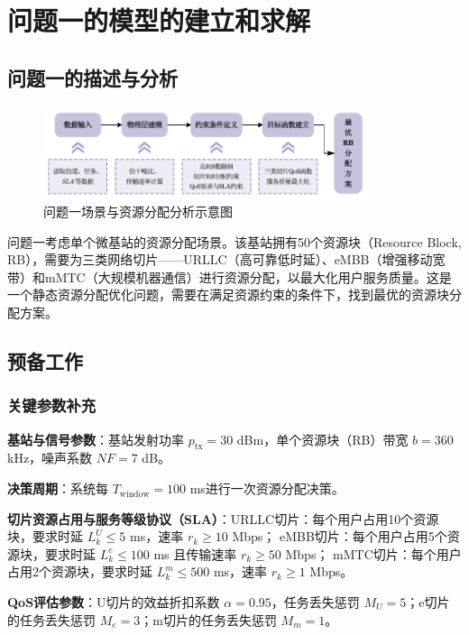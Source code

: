 \section{问题一的模型的建立和求解}
\subsection{问题一的描述与分析}
\begin{figure}[H]
    \centering
    \includegraphics[width=0.85\textwidth]{figures/第一问分析.pdf}
    \caption{问题一场景与资源分配分析示意图}
    \label{fig:q1-analysis}
\end{figure}

问题一考虑单个微基站的资源分配场景。该基站拥有50个资源块（Resource Block, RB），需要为三类网络切片——URLLC（高可靠低时延）、eMBB（增强移动宽带）和mMTC（大规模机器通信）进行资源分配，以最大化用户服务质量。这是一个静态资源分配优化问题，需要在满足资源约束的条件下，找到最优的资源块分配方案。

\subsection{预备工作}
\subsubsection{关键参数补充}

\textbf{基站与信号参数}：基站发射功率 $p_{\text{tx}} = 30$ dBm，单个资源块（RB）带宽 $b = 360$ kHz，噪声系数 $NF = 7$ dB。

\textbf{决策周期}：系统每 $T_{\text{window}} = 100$ ms进行一次资源分配决策。

\textbf{切片资源占用与服务等级协议（SLA）}：URLLC切片：每个用户占用10个资源块，要求时延 $L_k^U \leq 5$ ms，速率 $r_k \geq 10$ Mbps；
eMBB切片：每个用户占用5个资源块，要求时延 $L_k^e \leq 100$ ms 且传输速率 $r_k \geq 50$ Mbps；
mMTC切片：每个用户占用2个资源块，要求时延 $L_k^m \leq 500$ ms，速率 $r_k \geq 1$ Mbps。


\textbf{QoS评估参数}：U切片的效益折扣系数 $\alpha = 0.95$，任务丢失惩罚 $M_U = 5$；e切片的任务丢失惩罚 $M_e = 3$；m切片的任务丢失惩罚 $M_m = 1$。

